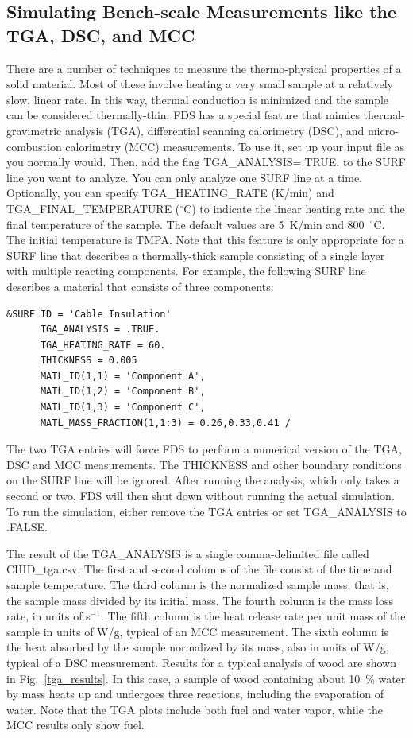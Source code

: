 \documentclass[11pt]{book}
\begin{document}
\subsection{Simulating Bench-scale Measurements like the TGA, DSC, and MCC}
\label{info:TGA_DSC_MCC}

There are a number of techniques to measure the thermo-physical properties of a solid material. Most of these involve heating a very small sample at a relatively slow, linear rate. In this way, thermal conduction is minimized and the sample can be considered thermally-thin. FDS has a special feature that mimics thermal-gravimetric analysis (TGA), differential scanning calorimetry (DSC), and micro-combustion calorimetry (MCC) measurements. To use it, set up your input file as you normally would. Then, add the flag {\ct TGA\_ANALYSIS=.TRUE.} to the {\ct SURF} line you want to analyze. You can only analyze one {\ct SURF} line at a time. Optionally, you can specify {\ct TGA\_HEATING\_RATE} (K/min) and {\ct TGA\_FINAL\_TEMPERATURE} ($^\circ$C) to indicate the linear heating rate and the final temperature of the sample. The default values are 5~K/min and 800~$^\circ$C. The initial temperature is {\ct TMPA}. Note that this feature is only appropriate for a {\ct SURF} line that describes a thermally-thick sample consisting of a single layer with multiple reacting components. For example, the following {\ct SURF} line describes a material that consists of three components:
\begin{lstlisting}
&SURF ID = 'Cable Insulation'
      TGA_ANALYSIS = .TRUE.
      TGA_HEATING_RATE = 60.
      THICKNESS = 0.005
      MATL_ID(1,1) = 'Component A',
      MATL_ID(1,2) = 'Component B',
      MATL_ID(1,3) = 'Component C',
      MATL_MASS_FRACTION(1,1:3) = 0.26,0.33,0.41 /
\end{lstlisting}
The two {\ct TGA} entries will force FDS to perform a numerical version of the TGA, DSC and MCC measurements. The {\ct THICKNESS} and other boundary conditions on the {\ct SURF} line will be ignored. After running the analysis, which only takes a second or two, FDS will then shut down without running the actual simulation. To run the simulation, either remove the {\ct TGA} entries or set {\ct TGA\_ANALYSIS} to {\ct .FALSE.}

The result of the {\ct TGA\_ANALYSIS} is a single comma-delimited file called {\ct CHID\_tga.csv}. The first and second columns of the file consist of the time and sample temperature. The third column is the normalized sample mass; that is, the sample mass divided by its initial mass. The fourth column is the mass loss rate, in units of s$^{-1}$. The fifth column is the heat release rate per unit mass of the sample in units of W/g, typical of an MCC measurement. The sixth column is the heat absorbed by the sample normalized by its mass, also in units of W/g, typical of a DSC measurement. Results for a typical analysis of wood are shown in Fig.~\ref{tga_results}. In this case, a sample of wood containing about 10~\% water by mass heats up and undergoes three reactions, including the evaporation of water. Note that the TGA plots include both fuel and water vapor, while the MCC results only show fuel.
\end{document}
